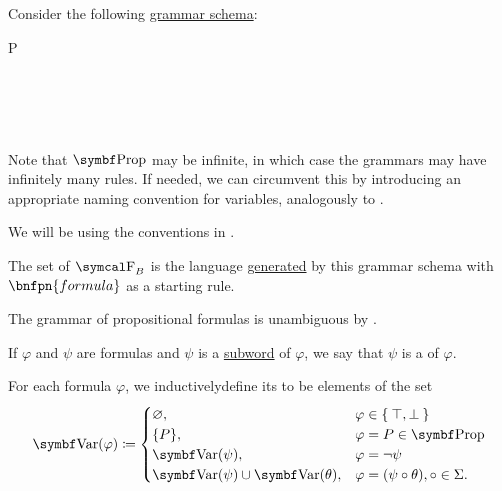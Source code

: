 \begin{definition}\label{def:propositional_language}\mbox{}
  \begin{DefEnum}
     Consider the following \hyperref[def:backus_naur_form]{grammar schema}:
    \begin{bnf*}
         {P \in {}} \\
       {\circ \in \Sigma} \\
          { \bnfor} \\
      \bnfmore             {\bnfts{\( \top \)} \bnfor \bnfts{\( \bot \)} \bnfor} \\
       \\
    \end{bnf*}

    Note that \( \Bold{Prop} \) may be infinite, in which case the grammars may have infinitely many rules. If needed, we can circumvent this by introducing an appropriate naming convention for variables, analogously to .

    We will be using the conventions in .

     The set of  \( \CF_B \) is the language \hyperref[def:grammar_derivation/grammar_language]{generated} by this grammar schema with \( \bnfpn{formula} \) as a starting rule.

    The grammar of propositional formulas is unambiguous by .

     If \( \varphi \) and \( \psi \) are formulas and \( \psi \) is a \hyperref[def:language/subword]{subword} of \( \varphi \), we say that \( \psi \) is a  of \( \varphi \).

     For each formula \( \varphi \), we inductively\IND define its  to be elements of the set
    \begin{equation}\label{eq:def:propositional_language/varables}
      \Bold{Var}(\varphi) \coloneqq \begin{cases}
        \varnothing,                              &\varphi \in \Set{ \top, \bot }                     \\
        \{ P \},                                  &\varphi = P \in \Bold{Prop}                      \\
        \Bold{Var}(\psi),                         &\varphi = \neg \psi                              \\
        \Bold{Var}(\psi) \cup \Bold{Var}(\theta), &\varphi = (\psi \circ \theta), \circ \in \Sigma.
      \end{cases}
    \end{equation}


\end{DefEnum}
\end{definition}
